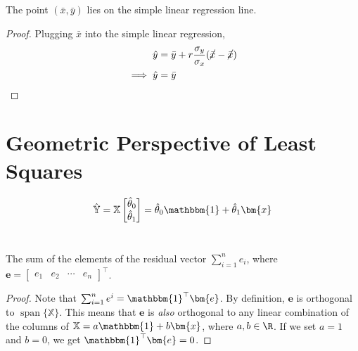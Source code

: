 \documentclass{article}
\newcommand{\X}{\mathbb{X}}
\newcommand{\Y}{\mathbb{Y}}
\newcommand{\One}{\mathbbm{1}}
\DeclareMathOperator{\Span}{span}
\begin{document}
\subsection{}

\begin{theorem}
    The point \((\bar{x}, \bar{y})\) lies on the simple linear regression line.
\end{theorem}
\begin{proof}
    Plugging \(\bar{x}\) into the simple linear regression,
    \begin{align}
        \hat{y} &= \bar{y} + r \frac{\sigma_y}{\sigma_x} (\cancel{\bar{x}} - \cancel{\bar{x}}) \\
        \implies \hat{y} &= \bar{y}
    \end{align}
\end{proof}

\section*{Geometric Perspective of Least Squares}

\begin{equation}
    \hat{\Y} =
    \X
    \begin{bmatrix}
        \hat{\theta}_0 \\
        \hat{\theta}_1
    \end{bmatrix} = \hat{\theta}_0 \One + \hat{\theta}_1 \bm{x}
\end{equation}

\section{}

\subsection{}

\begin{theorem}
    The sum of the elements of the residual vector \(\sum_{i = 1}^n e_i\), where \(\bm{e} =
    \begin{bmatrix}
        e_1 & e_2 & \cdots & e_n
    \end{bmatrix}^\top\).
\end{theorem}
\begin{proof}
    Note that \(\sum_{i = 1}^n e^i = \One^\top \bm{e}\).
    By definition, \(\bm{e}\) is orthogonal to \(\Span\{\X\}\).
    This means that \(\bm{e}\) is \emph{also} orthogonal to any linear combination of the columns of \(\X = a\One + b\bm{x}\), where \(a, b \in \R\).
    If we set \(a = 1\) and \(b = 0\), we get \(\One^\top \bm{e} = 0\).
\end{proof}
\end{document}
